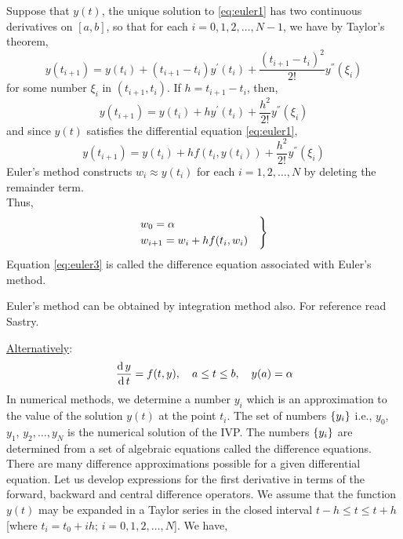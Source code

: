 \documentclass[../main-sheet.tex]{subfiles}
\begin{document}
        Suppose that \(y(t)\), the unique solution to \eqref{eq:euler1} has two continuous derivatives on \([a,b]\), so that for each \(i=0,1,2,\dots,N-1\), we have by Taylor's theorem,
        \[
            y(t_{i+1})=y(t_i)+(t_{i+1}-t_i) y^{'}(t_i)+\frac{(t_{i+1}-t_i)^2}{2!}y^{''}(\xi_i)
        \]
        for some number \(\xi_i\) in \((t_{i+1},t_i)\).
        If \(h=t_{i+1}-t_i\), then,
        \[
            y(t_{i+1})=y(t_i)+h y^{'}(t_i)+\frac{h^2}{2!}y^{''}(\xi_i)
        \]
        and since \(y(t)\) satisfies the differential equation \eqref{eq:euler1},
        \begin{equation}
            y(t_{i+1})=y(t_i)+h f(t_i,y(t_i))+\frac{h^2}{2!}y^{''}(\xi_i)
            \label{eq:euler2}
        \end{equation}
        Euler's method constructs \(w_i\approx y(t_i)\) for each \(i=1,2,\dots,N\) by deleting the remainder term.\\
        Thus,
        \begin{equation}
            \begin{rcases}
                w_0=\alpha\\
                w_{i+1}=w_i+hf(t_i,w_i)\quad
            \end{rcases}
            \label{eq:euler3}
        \end{equation}
        Equation \eqref{eq:euler3} is called the difference equation associated with Euler's method.
        \begin{note}
            Euler's method can be obtained by integration method also. For reference read Sastry.
        \end{note}
        \underline{Alternatively}:
        \[
            \,\frac{\mathrm{d}\,y}{\mathrm{d}\,t}=f(t,y),\quad a\leq t\leq b,\quad y(a)=\alpha
        \]
        In numerical methods, we determine a number \(y_i\) which is an approximation to the value of the solution \(y(t)\) at the point \(t_i\).
        The set of numbers \(\left\{y_i\right\}\) i.e., \(y_0\), \(y_1\), \(y_2,\dots,y_N\) is the numerical solution of the IVP.
        The numbers \(\left\{y_i\right\}\) are determined from a set of algebraic equations called the difference equations.
        There are many difference approximations possible for a given differential equation.
        Let us develop expressions for the first derivative in terms of the forward, backward and central difference operators.
        We assume that the function \(y(t)\) may be expanded in a Taylor series in the closed interval \(t-h\leq t\leq t+h\) [where \(t_i=t_0+ih\); \(i=0,1,2,\dots,N\)].
        We have,
\end{document}
